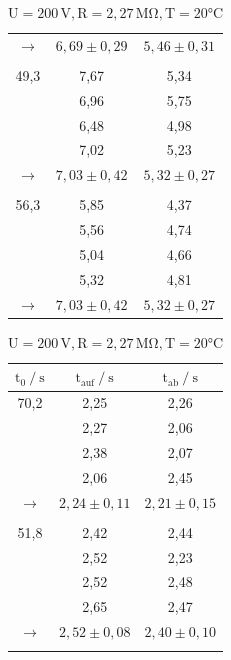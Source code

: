 \begin{table} [H]
\begin{subtable}[c]{0.5\textwidth}
\begin{tabular}{ c|c|c}
        \rowcolor{gray}$\to$ & $6,69 \pm 0,29$ & $5,46 \pm 0,31$ \\
            &  &  \\
        49,3 & 7,67 & 5,34 \\
            & 6,96 & 5,75 \\
            & 6,48 & 4,98 \\
            & 7,02 & 5,23 \\
        \rowcolor{gray}$\to$ & $7,03 \pm 0,42$ & $5,32 \pm 0,27$ \\
            &  &  \\
        56,3 & 5,85 & 4,37 \\
            & 5,56 & 4,74 \\
            & 5,04 & 4,66 \\
            & 5,32 & 4,81 \\
        \rowcolor{gray}$\to$ & $7,03 \pm 0,42$ & $5,32 \pm 0,27$ \\
    \bottomrule
    \end{tabular}
    \end{subtable}
    \begin{subtable}[c]{0.5\textwidth}
        \centering
        \caption{$\text{U} = 200\,\text{V}, \text{R} = 2,27\,\unit{\mega\ohm}, \text{T} = 20\unit{\celsius}$}
        \begin{tabular}{ c|c|c}
            \toprule
            {$\text{t}_{0} \mathbin{/}\unit{\second} $}&
            {$\text{t}_{\text{auf}} \mathbin{/}\unit{\second} $}&
            {$\text{t}_{\text{ab}} \mathbin{/}\unit{\second} $}\\
            \midrule
            70,2  & 2,25 & 2,26 \\
                & 2,27 & 2,06 \\
                & 2,38 & 2,07 \\
                & 2,06 & 2,45 \\
            \rowcolor{gray}$\to$ & $2,24 \pm 0,11$ & $2,21 \pm 0,15$ \\
                &  &  \\
            51,8 & 2,42 & 2,44\\
                & 2,52 & 2,23 \\
                & 2,52 & 2,48\\
                & 2,65 & 2,47 \\
            \rowcolor{gray}$\to$ & $2,52 \pm 0,08$ & $2,40 \pm 0,10$ \\
                &  &  \\

\end{tabular}
\end{subtable}
\end{table}
